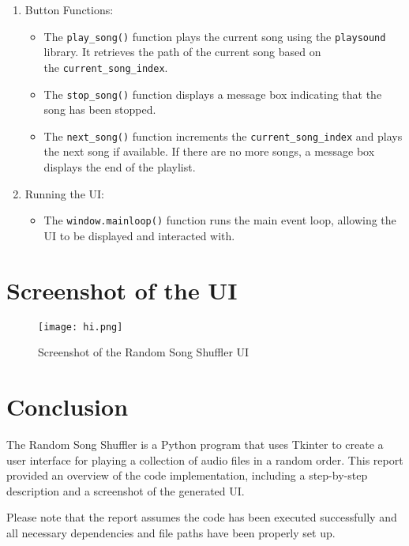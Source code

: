 \documentclass{article}
\begin{document}
\begin{enumerate}
  \item Button Functions:
    \begin{itemize}
    \item The \texttt{play\_song()} function plays the current song using the \texttt{playsound} library. It retrieves the path of the current song based on \\
      the \texttt{current\_song\_index}.
            \item The \texttt{stop\_song()} function displays a message box indicating that the song has been stopped.
      \item The \texttt{next\_song()} function increments the \texttt{current\_song\_index} and plays the next song if available. If there are no more songs, a message box displays the end of the playlist.
    \end{itemize}
  
  \item Running the UI:
    \begin{itemize}
      \item The \texttt{window.mainloop()} function runs the main event loop, allowing the UI to be displayed and interacted with.
    \end{itemize}
\end{enumerate}

\section{Screenshot of the UI}
\begin{figure}[htbp]
  \centering
  \texttt{[image: hi.png]}
  \caption{Screenshot of the Random Song Shuffler UI}
\end{figure}

\section{Conclusion}
The Random Song Shuffler is a Python program that uses Tkinter to create a user interface for playing a collection of audio files in a random order. This report provided an overview of the code implementation, including a step-by-step description and a screenshot of the generated UI.

Please note that the report assumes the code has been executed successfully and all necessary dependencies and file paths have been properly set up.
\end{document}
